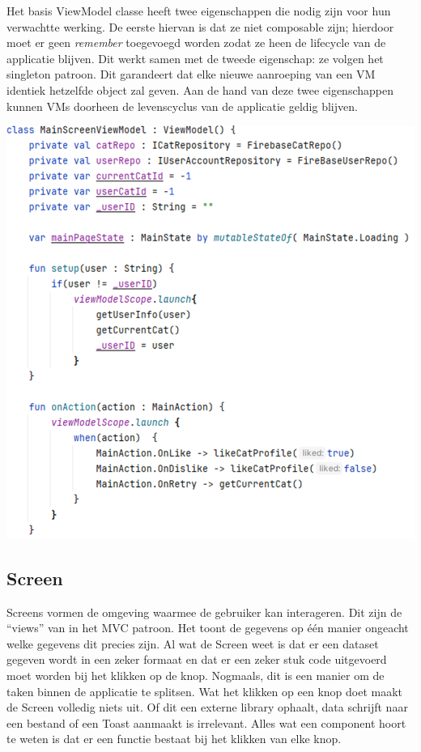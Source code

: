 \documentclass{report}
\begin{document}
Het basis ViewModel classe heeft twee eigenschappen die nodig zijn voor hun verwachtte werking.
De eerste hiervan is dat ze niet composable zijn; hierdoor moet er geen \textit{remember} toegevoegd worden zodat ze heen de lifecycle van de applicatie blijven.
Dit werkt samen met de tweede eigenschap: ze volgen het singleton patroon. Dit garandeert dat elke nieuwe aanroeping van een VM identiek hetzelfde object zal geven.
Aan de hand van deze twee eigenschappen kunnen VMs doorheen de levenscyclus van de applicatie geldig blijven.

\begin{center}
    \includegraphics{MVVM_Viewmodel}
\end{center}


\subsection{Screen}
Screens vormen de omgeving waarmee de gebruiker kan interageren. Dit zijn de ``views'' van in het MVC patroon.
Het toont de gegevens op één manier ongeacht welke gegevens dit precies zijn. 
Al wat de Screen weet is dat er een dataset gegeven wordt in een zeker formaat en dat er een zeker stuk code uitgevoerd moet worden bij het klikken op de knop.
Nogmaals, dit is een manier om de taken binnen de applicatie te splitsen. Wat het klikken op een knop doet maakt de Screen volledig niets uit. Of dit een externe library ophaalt, data schrijft naar een bestand of een Toast aanmaakt is irrelevant.
Alles wat een component hoort te weten is dat er een functie bestaat bij het klikken van elke knop.
\end{document}
